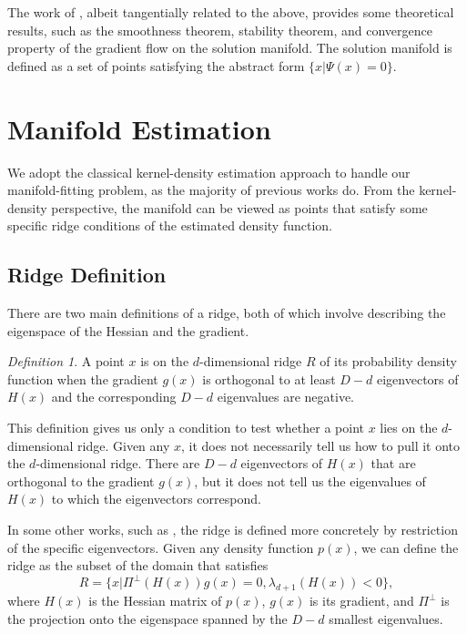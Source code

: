 \documentclass[aos,preprint]{imsart}
\theoremstyle{remark}
\newtheorem{definition}[theorem]{Definition}
\begin{document}
The work of \cite{chen2020solution}, albeit tangentially related to the above, provides some theoretical results, such as the smoothness theorem, stability theorem, and convergence property of the gradient flow on the solution manifold. The solution manifold is defined as a set of points satisfying the abstract form $\{x| \Psi(x) = 0\}$.


\section{Manifold Estimation}

We adopt the classical kernel-density estimation approach to handle our manifold-fitting problem, as the majority of previous works do. From the kernel-density perspective, the manifold can be viewed as points that satisfy some specific ridge conditions of the estimated density function.
\subsection{Ridge Definition}
There are two main definitions of a ridge, both of which involve describing the eigenspace of the Hessian and the gradient.
\begin{definition}\label{RR}
A point $x$ is on the $d$-dimensional ridge $R$ of its probability density function when the gradient $g(x)$ is orthogonal to at least $D-d$ eigenvectors of $H(x)$ and the corresponding $D-d$ eigenvalues are negative. \cite{ozertem2011locally}
\end{definition}
This definition gives us only a condition to test whether a point $x$ lies on the $d$-dimensional ridge. Given any $x$, it does not necessarily tell us how to pull it onto the $d$-dimensional ridge. There are $D-d$ eigenvectors of $H(x)$ that are orthogonal to the gradient $g(x)$, but it does not tell us the eigenvalues of $H(x)$ to which the eigenvectors correspond.

In some other works, such as \cite{genovese2014nonparametric}, the ridge is defined more concretely by restriction of the specific eigenvectors. Given any density function $p(x)$, we can define the ridge as the subset of the domain that satisfies
\begin{equation}\label{ridgeDF}
R = \{x| \Pi^{\perp}(H(x)) g(x) = 0, \lambda_{d+1}(H(x))<0\},
\end{equation}
where $H(x)$ is the Hessian matrix of $p(x)$, $g(x)$ is its gradient, and $\Pi^{\perp}$ is the projection onto the eigenspace spanned by the $D-d$ smallest eigenvalues.
\end{document}
